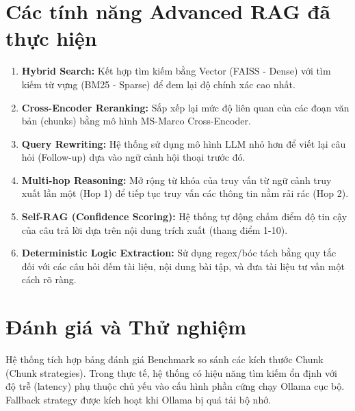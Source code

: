 \documentclass[12pt,a4paper]{article}
\begin{document}
\section{Các tính năng Advanced RAG đã thực hiện}
\begin{enumerate}
    \item \textbf{Hybrid Search:} Kết hợp tìm kiếm bằng Vector (FAISS - Dense) với tìm kiếm từ vựng (BM25 - Sparse) để đem lại độ chính xác cao nhất.
    \item \textbf{Cross-Encoder Reranking:} Sắp xếp lại mức độ liên quan của các đoạn văn bản (chunks) bằng mô hình MS-Marco Cross-Encoder.
    \item \textbf{Query Rewriting:} Hệ thống sử dụng mô hình LLM nhỏ hơn để viết lại câu hỏi (Follow-up) dựa vào ngữ cảnh hội thoại trước đó.
    \item \textbf{Multi-hop Reasoning:} Mở rộng từ khóa của truy vấn từ ngữ cảnh truy xuất lần một (Hop 1) để tiếp tục truy vấn các thông tin nằm rải rác (Hop 2).
    \item \textbf{Self-RAG (Confidence Scoring):} Hệ thống tự động chấm điểm độ tin cậy của câu trả lời dựa trên nội dung trích xuất (thang điểm 1-10).
    \item \textbf{Deterministic Logic Extraction:} Sử dụng regex/bóc tách bằng quy tắc đối với các câu hỏi đếm tài liệu, nội dung bài tập, và đưa tài liệu tư vấn một cách rõ ràng.
\end{enumerate}

\section{Đánh giá và Thử nghiệm}
Hệ thống tích hợp bảng đánh giá Benchmark so sánh các kích thước Chunk (Chunk strategies). Trong thực tế, hệ thống có hiệu năng tìm kiếm ổn định với độ trễ (latency) phụ thuộc chủ yếu vào cấu hình phần cứng chạy Ollama cục bộ. Fallback strategy được kích hoạt khi Ollama bị quá tải bộ nhớ.
\end{document}
